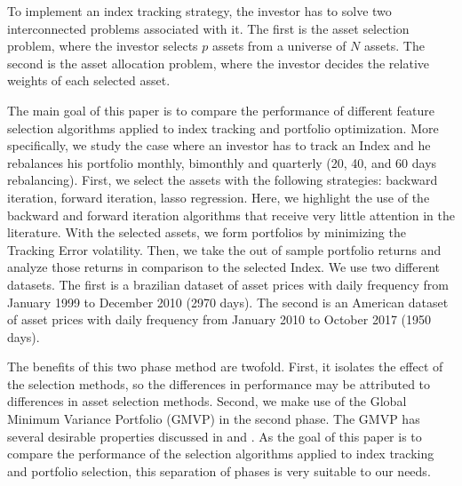 \documentclass[12pt,oneside,a4paper]{memoir}
\begin{document}
To implement an index tracking strategy, the investor has to solve two interconnected problems associated with it.
The first is the asset selection problem, where the investor selects $p$ assets from a universe of $N$ assets.
The second is the asset allocation problem, where the investor decides the relative weights of each selected asset.


The main goal of this paper is to compare the performance of different feature selection algorithms applied to index tracking and portfolio optimization.
More specifically, we study the case where an investor has to track an Index and he rebalances his portfolio monthly, bimonthly and quarterly (20, 40, and 60 days rebalancing).
First, we select the assets with the following strategies:
backward iteration, forward iteration, lasso regression.
Here, we highlight the use of the backward and forward iteration algorithms that receive very little attention in the literature.
With the selected assets, we form portfolios by minimizing the Tracking Error volatility.
Then, we take the out of sample portfolio returns and analyze those returns in comparison to the selected Index.
We use two different datasets.
The first is a brazilian dataset of asset prices with daily frequency from January 1999 to December 2010 (2970 days).
The second is an American dataset of asset prices with daily frequency from January 2010 to October 2017 (1950 days).

The benefits of this two phase method are twofold.
First, it isolates the effect of the selection methods, so the differences in performance may be attributed to differences in asset selection methods.
Second, we make use of the Global Minimum Variance Portfolio (GMVP) in the second phase.
The GMVP has several desirable properties discussed in  and .
As the goal of this paper is to compare the performance of the selection algorithms applied to index tracking and portfolio selection, this separation of phases is very suitable to our needs.

\end{document}
